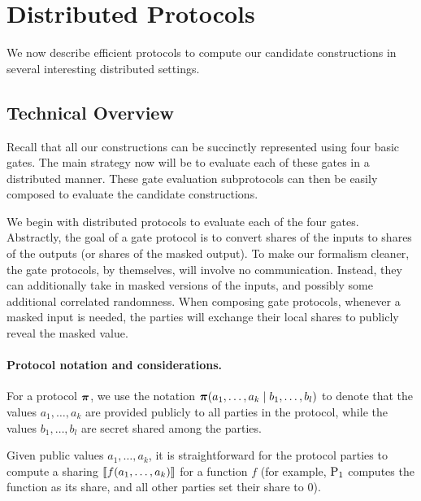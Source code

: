 \newpage
\section{Distributed Protocols}
\label{sec:distributed_protocols}
We now describe efficient protocols to compute our candidate constructions in several interesting distributed settings.


\subsection{Technical Overview}
Recall that all our constructions can be succinctly represented using four basic gates. The main strategy now will be to evaluate each of these gates in a distributed manner. These gate evaluation subprotocols can then be easily composed to evaluate the  candidate constructions. 


We begin with distributed protocols to evaluate each of the four gates. Abstractly, the goal of a gate protocol is to convert shares of the inputs to shares of the outputs (or shares of the masked output). To make our formalism cleaner, the gate protocols, by themselves, will involve no communication. Instead, they can additionally take in masked versions of the inputs, and possibly some additional correlated randomness. When composing gate protocols, whenever a masked input is needed, the parties will exchange their local shares to publicly reveal the masked value.

\paragraph{Protocol notation and considerations.}
For a protocol $\boldsymbol{\pi}$, we use the notation $\boldsymbol{\pi}(a_1, \dots, a_k \mid b_1, \dots, b_l)$ to denote that the values $a_1, \dots, a_k$ are provided publicly to all parties in the protocol, while the values $b_1, \dots, b_l$ are secret shared among the parties.

Given public values $a_1, \dots, a_k$, it is straightforward for the protocol parties to compute a sharing $\left\llbracket f(a_1, \dots, a_k) \right\rrbracket$ for a function $f$ (for example, $\textnormal{P}_1$ computes the function as its share, and all other parties set their share to $0$).

